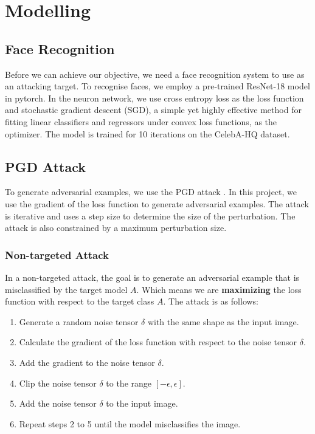 \section{Modelling}

\subsection{Face Recognition}

Before we can achieve our objective, we need a face recognition system to use as an attacking target. To recognise faces, we employ a pre-trained ResNet-18 model in pytorch.
In the neuron network, we use cross entropy loss as the loss function and stochastic gradient descent (SGD), a simple yet highly effective method for fitting linear classifiers and regressors under convex loss functions, as the optimizer. The model is trained for 10 iterations on the CelebA-HQ dataset.

\subsection{PGD Attack}

To generate adversarial examples, we use the PGD attack \cite{madry2017towards}. In this project, we use the gradient of the loss function to generate adversarial examples. The attack is iterative and uses a step size to determine the size of the perturbation. The attack is also constrained by a maximum perturbation size.

\subsubsection{Non-targeted Attack}

In a non-targeted attack, the goal is to generate an adversarial example that is misclassified by the target model $A$. Which means we are \textbf{maximizing} the loss function with respect to the target class $A$. The attack is as follows:

\begin{enumerate}
    \item Generate a random noise tensor $\delta$ with the same shape as the input image.
    \item Calculate the gradient of the loss function with respect to the noise tensor $\delta$.
    \item Add the gradient to the noise tensor $\delta$.
    \item Clip the noise tensor $\delta$ to the range $[-\epsilon, \epsilon]$.
    \item Add the noise tensor $\delta$ to the input image.
    \item Repeat steps 2 to 5 until the model misclassifies the image.
\end{enumerate}

